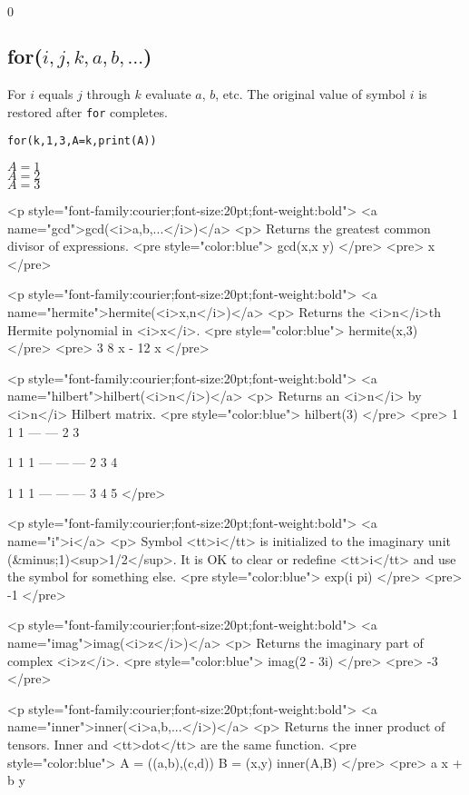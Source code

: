 \noindent
$0$

\subsection*{for($i,j,k,a,b,\ldots$)}

For $i$ equals $j$ through $k$ evaluate $a$, $b$, etc.
The original value of symbol $i$ is restored after {\tt for} completes.

{\color{blue}
\begin{verbatim}
for(k,1,3,A=k,print(A))
\end{verbatim}
}

\noindent
$A=1$\\
$A=2$\\
$A=3$

\iffalse

<p style="font-family:courier;font-size:20pt;font-weight:bold">
<a name="gcd">gcd(<i>a,b,...</i>)</a>
<p>
Returns the greatest common divisor of expressions.
<pre style="color:blue">
gcd(x,x y)
</pre>
<pre>
x
</pre>

<p style="font-family:courier;font-size:20pt;font-weight:bold">
<a name="hermite">hermite(<i>x,n</i>)</a>
<p>
Returns the <i>n</i>th Hermite polynomial in <i>x</i>.
<pre style="color:blue">
hermite(x,3)
</pre>
<pre>
   3
8 x  - 12 x
</pre>

<p style="font-family:courier;font-size:20pt;font-weight:bold">
<a name="hilbert">hilbert(<i>n</i>)</a>
<p>
Returns an <i>n</i> by <i>n</i> Hilbert matrix.
<pre style="color:blue">
hilbert(3)
</pre>
<pre>
       1     1
 1    ---   ---
       2     3

 1     1     1
---   ---   ---
 2     3     4

 1     1     1
---   ---   ---
 3     4     5
</pre>

<p style="font-family:courier;font-size:20pt;font-weight:bold">
<a name="i">i</a>
<p>
Symbol <tt>i</tt> is initialized to the imaginary unit (&minus;1)<sup>1/2</sup>.
It is OK to clear or redefine <tt>i</tt> and use the symbol for something else.
<pre style="color:blue">
exp(i pi)
</pre>
<pre>
-1
</pre>

<p style="font-family:courier;font-size:20pt;font-weight:bold">
<a name="imag">imag(<i>z</i>)</a>
<p>
Returns the imaginary part of complex <i>z</i>.
<pre style="color:blue">
imag(2 - 3i)
</pre>
<pre>
-3
</pre>

<p style="font-family:courier;font-size:20pt;font-weight:bold">
<a name="inner">inner(<i>a,b,...</i>)</a>
<p>
Returns the inner product of tensors.
Inner and <tt>dot</tt> are the same function.
<pre style="color:blue">
A = ((a,b),(c,d))
B = (x,y)
inner(A,B)
</pre>
<pre>
a x + b y

